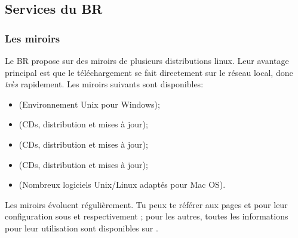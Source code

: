 \subsection{Services du BR}


\subsubsection{Les miroirs}
Le BR propose sur  des miroirs de plusieurs distributions linux. Leur avantage principal est que le téléchargement se fait directement sur le réseau local, donc \emph{très} rapidement.
Les miroirs suivants sont disponibles:

\begin{itemize}
\item {} (Environnement Unix pour Windows);
\item {} (CDs, distribution et mises à jour);
\item {} (CDs, distribution et mises à jour);
\item {} (CDs, distribution et mises à jour);
\item {} (Nombreux logiciels Unix/Linux adaptés pour Mac OS).
\end{itemize}


Les miroirs évoluent régulièrement. Tu peux te référer aux pages \pageref{gentoo_mirror} et \pageref{ubuntu_mirror} pour leur configuration sous  et  respectivement ; pour les autres, toutes les informations pour leur utilisation sont disponibles sur .
